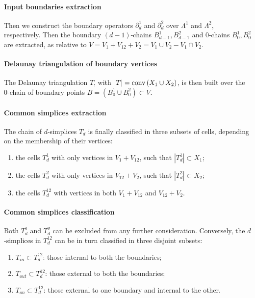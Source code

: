 \documentclass[11pt,oneside]{article}	%
\def\conv{\mbox{\textrm{conv}\,}}
\def\conv{\mbox{\rm conv}\,}
\begin{document}
\paragraph{Input boundaries extraction}
Then we construct the boundary operators $\partial_d^1$ and $\partial_d^2$ over $\Lambda^1$ and $\Lambda^2$, respectively.
Then the boundary $(d-1)$-chains $B_{d-1}^1,B_{d-1}^2$ and $0$-chains $B_{0}^1,B_{0}^2$ are extracted, as relative to $V = V_{1} + V_{12} + V_{2} = V_{1} \cup V_{2} - V_{1} \cap V_{2}$.

\paragraph{Delaunay triangulation of boundary vertices}
The Delaunay triangulation $T$, with $|T| = \conv (X_1 \cup X_2)$, is then built over the 0-chain of boundary points $B = (B_{0}^1 \cup B_{0}^2) \subset V$.

\paragraph{Common simplices extraction}
The chain of $d$-simplices $T_d$ is finally classified in three subsets of cells, depending on the membership of their vertices:
\begin{enumerate}
\item the cells $T_d^1$ with only vertices in $V_{1} + V_{12}$, such that $|T_d^1|\subset X_1$;
\item the cells $T_d^2$ with only vertices in $V_{12} + V_{2}$, such that $|T_d^2|\subset X_2$;
\item the cells $T_d^{12}$ with vertices in both $V_{1}+V_{12}$ and $V_{12}+V_{2}$.
\end{enumerate}

\paragraph{Common simplices classification}
Both $T_d^1$ and $T_d^2$ can be excluded from any further consideration. Conversely, the $d$-simplices in $T_d^{12}$ can be in turn classified in three disjoint subsets: 
\begin{enumerate}
\item $T_{{in}}\subset T_d^{12}$: those internal to both the boundaries;
\item $T_{{out}}\subset T_d^{12}$: those external to both the boundaries;
\item $T_{{on}}\subset T_d^{12}$: those external to one boundary and internal to the other.
\end{enumerate}
\end{document}
